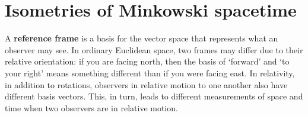 \documentclass[12pt, oneside]{report}    %
\let\oldsection\section
\def\section{%
  \setcounter{sidenote}{1}%
  \oldsection
}
\begin{document}
\section{Isometries of Minkowski spacetime}\label{sec:Lorentz:transformations}


A \textbf{reference frame} is a basis for the vector space that represents what an observer may see. In ordinary Euclidean space, two frames may differ due to their relative orientation: if you are facing north, then the basis of `forward' and `to your right' means something different than if you were facing east. In relativity, in addition to rotations, observers in relative motion to one another also have different basis vectors. This, in turn, leads to different measurements of space and time when two observers are in relative motion.
\end{document}
